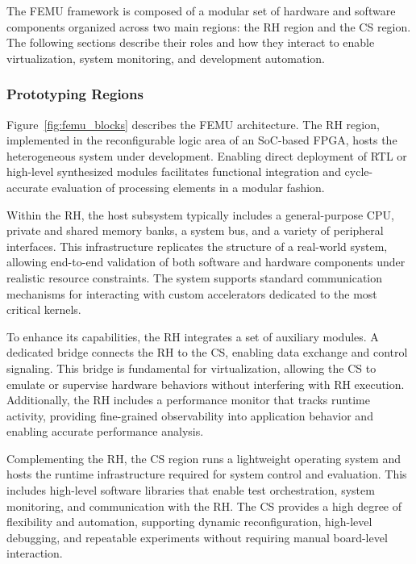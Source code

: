             The \mbox{FEMU} framework is composed of a modular set of hardware and software components organized across two main regions: the RH region and the CS region. The following sections describe their roles and how they interact to enable virtualization, system monitoring, and development automation.

            \subsubsection{Prototyping Regions}
            
                Figure~\ref{fig:femu_blocks} describes the \mbox{FEMU} architecture. The RH region, implemented in the reconfigurable logic area of an SoC-based FPGA, hosts the heterogeneous system under development. Enabling direct deployment of RTL or high-level synthesized modules facilitates functional integration and cycle-accurate evaluation of processing elements in a modular fashion.
            
                Within the RH, the host subsystem typically includes a general-purpose CPU, private and shared memory banks, a system bus, and a variety of peripheral interfaces. This infrastructure replicates the structure of a real-world system, allowing end-to-end validation of both software and hardware components under realistic resource constraints. The system supports standard communication mechanisms for interacting with custom accelerators dedicated to the most critical kernels.
            
                To enhance its capabilities, the RH integrates a set of auxiliary modules. A dedicated bridge connects the RH to the CS, enabling data exchange and control signaling. This bridge is fundamental for virtualization, allowing the CS to emulate or supervise hardware behaviors without interfering with RH execution. Additionally, the RH includes a performance monitor that tracks runtime activity, providing fine-grained observability into application behavior and enabling accurate performance analysis.
            
                Complementing the RH, the CS region runs a lightweight operating system and hosts the runtime infrastructure required for system control and evaluation. This includes high-level software libraries that enable test orchestration, system monitoring, and communication with the RH. The CS provides a high degree of flexibility and automation, supporting dynamic reconfiguration, high-level debugging, and repeatable experiments without requiring manual board-level interaction.

